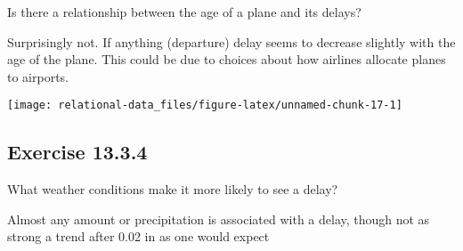 \documentclass[]{book}
\newenvironment{Shaded}{\begin{snugshade}}{\end{snugshade}}
\newcommand{\CommentTok}[1]{\textcolor[rgb]{0.56,0.35,0.01}{\textit{#1}}}
\newcommand{\DataTypeTok}[1]{\textcolor[rgb]{0.13,0.29,0.53}{#1}}
\newcommand{\DecValTok}[1]{\textcolor[rgb]{0.00,0.00,0.81}{#1}}
\newcommand{\KeywordTok}[1]{\textcolor[rgb]{0.13,0.29,0.53}{\textbf{#1}}}
\newcommand{\NormalTok}[1]{#1}
\newcommand{\OperatorTok}[1]{\textcolor[rgb]{0.81,0.36,0.00}{\textbf{#1}}}
\newcommand{\StringTok}[1]{\textcolor[rgb]{0.31,0.60,0.02}{#1}}
\theoremstyle{plain}
\theoremstyle{remark}
\theoremstyle{definition}
\theoremstyle{definition}
\theoremstyle{definition}
\theoremstyle{remark}
\begin{document}
Is there a relationship between the age of a plane and its delays?

Surprisingly not. If anything (departure) delay seems to decrease
slightly with the age of the plane. This could be due to choices about
how airlines allocate planes to airports.

\begin{Shaded}
\end{Shaded}

\begin{center}\texttt{[image: relational-data\_files/figure-latex/unnamed-chunk-17-1]} \end{center}

\hypertarget{exercise-13.3.4}{%
\subsection*{\texorpdfstring{Exercise
{13.3.4}}{Exercise 13.3.4}}\label{exercise-13.3.4}}

What weather conditions make it more likely to see a delay?

Almost any amount or precipitation is associated with a delay, though
not as strong a trend after 0.02 in as one would expect
\end{document}
